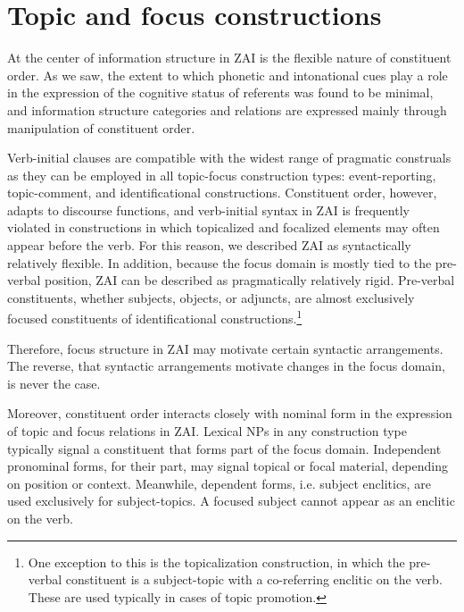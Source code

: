 

\section{Topic and focus constructions}

At the center of information structure in ZAI is the flexible nature of constituent order. As we saw, the extent to which phonetic and intonational cues play a role in the expression of the cognitive status of referents was found to be minimal, and information structure categories and relations are expressed mainly through manipulation of constituent order. 

Verb-initial clauses are compatible with the widest range of pragmatic construals as they can be employed in all topic-focus construction types: event-reporting, topic-comment, and identificational constructions. Constituent order, however, adapts to discourse functions, and verb-initial syntax in ZAI is frequently violated in constructions in which topicalized and focalized elements may often appear before the verb. For this reason, we described ZAI as syntactically relatively flexible. In addition, because the focus domain is mostly tied to the pre-verbal position, ZAI can be described as pragmatically relatively rigid. Pre-verbal constituents, whether subjects, objects, or adjuncts, are almost exclusively focused constituents of identificational constructions.\footnote{One exception to this is the topicalization construction, in which the pre-verbal constituent is a subject-topic with a co-referring enclitic on the verb. These are used typically in cases of topic promotion.} 

Therefore, focus structure in ZAI may motivate certain syntactic arrangements. The reverse, that syntactic arrangements motivate changes in the focus domain, is never the case. 

Moreover, constituent order interacts closely with nominal form in the expression of topic and focus relations in ZAI. Lexical NPs in any construction type typically signal a constituent that forms part of the focus domain. Independent pronominal forms, for their part, may signal topical or focal material, depending on position or context. Meanwhile, dependent forms, i.e. subject enclitics, are used exclusively for subject-topics. A focused subject cannot appear as an enclitic on the verb. 

